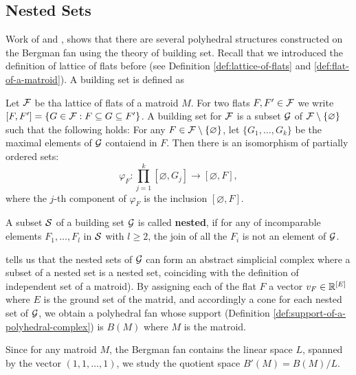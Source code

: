     \subsection{Nested Sets}
    \label{subsec:nested-sets}
        Work of \citet{Feichtner2005} and \citet{Maclagan2015},
        shows that there are several polyhedral structures constructed on the Bergman fan using the theory of building set.
        Recall that we introduced the definition of lattice of flats before (see Definition \ref{def:lattice-of-flats}
        and \ref{def:flat-of-a-matroid}).
        A building set is defined as 
        \begin{definition}
        \label{def:building-set}
            Let $\mathcal{F}$ be tha lattice of flats of a matroid $M$.
            For two flats $F, F' \in \mathcal{F}$ we write $[F, F'] = \{G \in \mathcal{F}: F \subseteq G \subseteq F'\}$. 
            A building set for $\mathcal{F}$ is a subset $\mathcal{G}$ of $\mathcal{F}\setminus \{\varnothing\}$ such that the following holds:
            For any $F \in \mathcal{F}\setminus \{\varnothing\}$, 
            let $\{G_1, \ldots, G_k\}$ be the maximal elements of $\mathcal{G}$ contaiend in $F$.
            Then there is an isomorphism of partially ordered sets:
            \[
            \varphi_F: \prod\limits_{j=1}^{k} [\varnothing, G_j] \rightarrow [\varnothing, F],
            \] where the $j$-th component of $\varphi_F$ is the inclusion 
            $[\varnothing, F]$.
        \end{definition}
        
        \begin{definition}
        \label{def:nested-set}
            A subset $\mathcal{S}$ of a building set $\mathcal{G}$ is called \textbf{nested}, 
            if for any of incomparable elements $F_1, \ldots, F_l$ in $\mathcal{S}$ with $l \ge 2$,
            the join of all the $F_i$ is not an element of $\mathcal{G}$.
        \end{definition}
        \citet{Cavalieri2014} tells us that the nested sets of $\mathcal{G}$ can form an abstract simplicial complex where a subset of a nested set is a nested set, coinciding with the definition of independent set of a matroid).
        By assigning each of the flat $F$ a vector $v_F \in \mathbb{R}^{[E]}$ 
        where $E$ is the ground set of the matrid,
        and accordingly a cone for each nested set of $\mathcal{G}$,
        we obtain a polyhedral fan whose support (Definition \ref{def:support-of-a-polyhedral-complex}) is $B(M)$ where $M$ is the matroid. 
    
   	    \begin{definition}
    	\label{def:bergman-fan-quotient-space}
    	    Since for any matroid $M$,
    	    the Bergman fan contains the linear space $L$,
    	    spanned by the vector $(1, 1, \ldots, 1)$,
    	    we study the quotient space $B'(M) = B(M)/L$.
        \end{definition}
        

    

    

